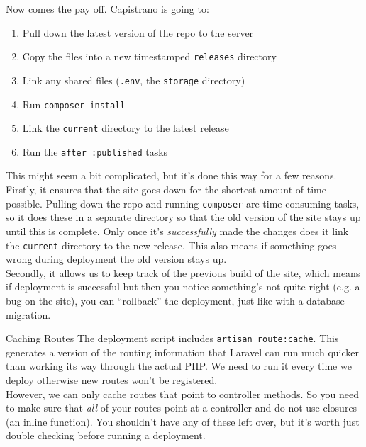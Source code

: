 Now comes the pay off. Capistrano is going to:

\begin{enumerate}
    \item Pull down the latest version of the repo to the server
    \item Copy the files into a new timestamped \texttt{releases} directory
    \item Link any shared files (\texttt{.env}, the \texttt{storage} directory)
    \item Run \texttt{composer install}
    \item Link the \texttt{current} directory to the latest release
    \item Run the \texttt{after :published} tasks
\end{enumerate}

This might seem a bit complicated, but it's done this way for a few reasons.
\\

Firstly, it ensures that the site goes down for the shortest amount of time possible. Pulling down the repo and running \texttt{composer} are time consuming tasks, so it does these in a separate directory so that the old version of the site stays up until this is complete. Only once it's \textit{successfully} made the changes does it link the \texttt{current} directory to the new release. This also means if something goes wrong during deployment the old version stays up.
\\

Secondly, it allows us to keep track of the previous build of the site, which means if deployment is successful but then you notice something's not quite right (e.g. a bug on the site), you can ``rollback'' the deployment, just like with a database migration.

\begin{infobox}{Caching Routes}
    The deployment script includes \texttt{artisan route:cache}. This generates a version of the routing information that Laravel can run much quicker than working its way through the actual PHP. We need to run it every time we deploy otherwise new routes won't be registered.
    \\

    However, we can only cache routes that point to controller methods. So you need to make sure that \textit{all} of your routes point at a controller and do not use closures (an inline function). You shouldn't have any of these left over, but it's worth just double checking before running a deployment.
\end{infobox}


